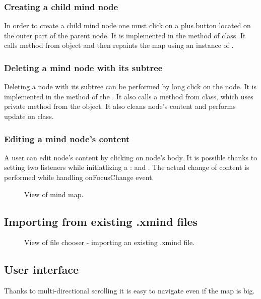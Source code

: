 \subsubsection{Creating a child mind node}
\label{subsubsec:create-child}
In order to create a child mind node one must click on a plus button located on the outer part of the parent node. It is implemented in the  method of  class. It calls  method from  object and then repaints the map using an instance of .

\subsubsection{Deleting a mind node with its subtree}
\label{subsubsec:delete-node}
 Deleting a node with its subtree can be performed by long click on the node. It is implemented in the  method of the . It also calls a  method from  class, which uses  private method from the  object. It also cleans node's content and performs update on  class. 
 
\subsubsection{Editing a mind node's content}
\label{subsubsec:delete-node}
A user can edit node's content by clicking on node's body. It is possible thanks to setting two listeners while initiatlizing a :  and . The actual change of content is performed while handling onFocusChange event.

\begin{figure}[h]
	\centering
	\caption{View of mind map.}
	\label{fig:screen-map}
\end{figure}

\subsection{Importing from existing .xmind files}
\label{subsec:import}

\begin{figure}[h]
	\centering
	\caption{View of file chooser - importing an existing .xmind file.}
	\label{fig:screen-filechooser}
\end{figure}


\subsection{User interface}
\label{subsec:ui}
Thanks to multi-directional scrolling it is easy to navigate even if the map is big.

